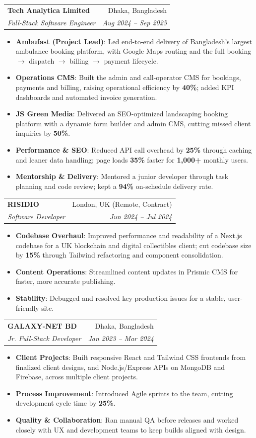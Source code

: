 \documentclass[letterpaper,12pt]{article}
\makeatletter
\newcommand{\resumeItem}[2]{
  \item\small{
    \textbf{#1}{: #2 \vspace{-2pt}}
  }
}
\newcommand{\resumeSubheading}[4]{
  \Needspace{4\baselineskip}\vspace{-1pt}\item
    \begin{tabular*}{0.97\textwidth}[t]{l@{\extracolsep{\fill}}r}
      \textbf{#1} & \small #2 \\
      \small\textit{#3} & \small\textit{#4} \\
    \end{tabular*}\vspace{-5pt}
}
\newcommand{\resumeItemListStart}{\begin{itemize}}
\newcommand{\resumeItemListEnd}{\end{itemize}\vspace{-5pt}}
\makeatother
\begin{document}
    \resumeSubheading
      {Tech Analytica Limited}{Dhaka, Bangladesh}
      {Full-Stack Software Engineer}{Aug 2024 -- Sep 2025}
      \resumeItemListStart
        \resumeItem{Ambufast (Project Lead)}
          {Led end-to-end delivery of Bangladesh's largest ambulance booking platform, with Google Maps routing and the full booking $\rightarrow$ dispatch $\rightarrow$ billing $\rightarrow$ payment lifecycle.}
        \resumeItem{Operations CMS}
          {Built the admin and call-operator CMS for bookings, payments and billing, raising operational efficiency by \textbf{40\%}; added KPI dashboards and automated invoice generation.}
        \resumeItem{JS Green Media}
          {Delivered an SEO-optimized landscaping booking platform with a dynamic form builder and admin CMS, cutting missed client inquiries by \textbf{50\%}.}
        \resumeItem{Performance \& SEO}
          {Reduced API call overhead by \textbf{25\%} through caching and leaner data handling; page loads \textbf{35\%} faster for \textbf{1,000+} monthly users.}
        \resumeItem{Mentorship \& Delivery}
          {Mentored a junior developer through task planning and code review; kept a \textbf{94\%} on-schedule delivery rate.}
      \resumeItemListEnd

    \resumeSubheading
      {RISIDIO}{London, UK (Remote, Contract)}
      {Software Developer}{Jun 2024 -- Jul 2024}
      \resumeItemListStart
        \resumeItem{Codebase Overhaul}
          {Improved performance and readability of a Next.js codebase for a UK blockchain and digital collectibles client; cut codebase size by \textbf{15\%} through Tailwind refactoring and component consolidation.}
        \resumeItem{Content Operations}
          {Streamlined content updates in Prismic CMS for faster, more accurate publishing.}
        \resumeItem{Stability}
          {Debugged and resolved key production issues for a stable, user-friendly site.}
      \resumeItemListEnd

    \resumeSubheading
      {GALAXY-NET BD}{Dhaka, Bangladesh}
      {Jr. Full-Stack Developer}{Jan 2023 -- Mar 2024}
      \resumeItemListStart
        \resumeItem{Client Projects}
          {Built responsive React and Tailwind CSS frontends from finalized client designs, and Node.js/Express APIs on MongoDB and Firebase, across multiple client projects.}
        \resumeItem{Process Improvement}
          {Introduced Agile sprints to the team, cutting development cycle time by \textbf{25\%}.}
        \resumeItem{Quality \& Collaboration}
          {Ran manual QA before releases and worked closely with UX and development teams to keep builds aligned with design.}
      \resumeItemListEnd
\end{document}
